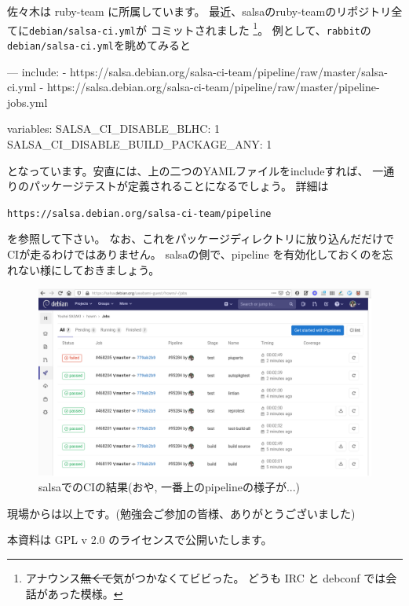 \documentclass[mingoth,a4paper]{jsarticle}
\begin{document}
佐々木は ruby-team に所属しています。
最近、salsaのruby-teamのリポジトリ全てに\texttt{debian/salsa-ci.yml}が
コミットされました
\footnote{%
  アナウンス\sout{無くて}気がつかなくてビビった。
  どうも IRC と debconf では会話があった模様。
}。
例として、\texttt{rabbit}の\texttt{debian/salsa-ci.yml}を眺めてみると
\begin{commandline}
---
include:
  - https://salsa.debian.org/salsa-ci-team/pipeline/raw/master/salsa-ci.yml
  - https://salsa.debian.org/salsa-ci-team/pipeline/raw/master/pipeline-jobs.yml

variables:
  SALSA_CI_DISABLE_BLHC: 1
  SALSA_CI_DISABLE_BUILD_PACKAGE_ANY: 1
\end{commandline}
\noindent
となっています。安直には、上の二つのYAMLファイルをincludeすれば、
一通りのパッケージテストが定義されることになるでしょう。
詳細は
\begin{center}
  \texttt{https://salsa.debian.org/salsa-ci-team/pipeline}
\end{center}
を参照して下さい。
なお、これをパッケージディレクトリに放り込んだだけでCIが走るわけではありません。
salsaの側で、pipeline を有効化しておくのを忘れない様にしておきましょう。
\begin{figure}[htbp!]
  \centering
  \includegraphics[height=.26\textheight]{image201912/2019-12-22-salsa-ci.png}
  \caption{salsaでのCIの結果(おや, 一番上のpipelineの様子が...)}
\end{figure}

現場からは以上です。\hfill(勉強会ご参加の皆様、ありがとうございました)

\clearpage



\vspace{\fill}
本資料は GPL v 2.0 のライセンスで公開いたします。
\end{document}
